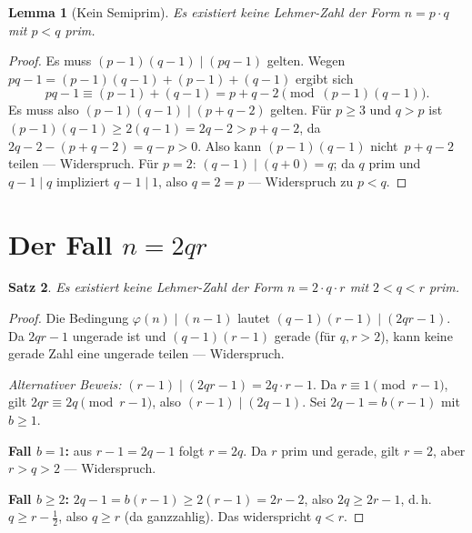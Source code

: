 \documentclass[12pt,a4paper]{amsart}
\newtheorem{theorem}{Satz}[section]
\newtheorem{lemma}[theorem]{Lemma}
\theoremstyle{definition}
\newcommand{\euler}{\varphi}
\begin{document}
\begin{lemma}[Kein Semiprim]
\label{lem:semiprim}
Es existiert keine Lehmer-Zahl der Form $n = p \cdot q$ mit $p < q$ prim.
\end{lemma}

\begin{proof}
Es muss $(p-1)(q-1) \mid (pq - 1)$ gelten.
Wegen $pq - 1 = (p-1)(q-1) + (p-1) + (q-1)$ ergibt sich
\[
  pq - 1 \equiv (p-1) + (q-1) = p + q - 2 \pmod{(p-1)(q-1)}.
\]
Es muss also $(p-1)(q-1) \mid (p + q - 2)$ gelten.
Für $p \ge 3$ und $q > p$ ist $(p-1)(q-1) \ge 2(q-1) = 2q - 2 > p + q - 2$,
da $2q - 2 - (p + q - 2) = q - p > 0$. Also kann $(p-1)(q-1)$ nicht~$p + q - 2$
teilen — Widerspruch. Für $p = 2$: $(q-1) \mid (q + 0) = q$; da $q$ prim und
$q - 1 \mid q$ impliziert $q - 1 \mid 1$, also $q = 2 = p$ — Widerspruch zu $p < q$.
\end{proof}

\section{Der Fall \texorpdfstring{$n = 2qr$}{n = 2qr}}
\label{sec:gerade}

\begin{theorem}
\label{thm:2qr}
Es existiert keine Lehmer-Zahl der Form $n = 2 \cdot q \cdot r$
mit $2 < q < r$ prim.
\end{theorem}

\begin{proof}
Die Bedingung $\euler(n) \mid (n-1)$ lautet $(q-1)(r-1) \mid (2qr - 1)$.
Da $2qr - 1$ ungerade ist und $(q-1)(r-1)$ gerade (für $q, r > 2$), kann keine
gerade Zahl eine ungerade teilen — Widerspruch.

\medskip\noindent\textit{Alternativer Beweis:}
$(r-1) \mid (2qr - 1) = 2q \cdot r - 1$.
Da $r \equiv 1 \pmod{r-1}$, gilt $2qr \equiv 2q \pmod{r-1}$, also
$(r-1) \mid (2q - 1)$. Sei $2q - 1 = b(r-1)$ mit $b \ge 1$.

\noindent\textbf{Fall $b = 1$:} aus $r - 1 = 2q - 1$ folgt $r = 2q$. Da $r$ prim und gerade,
gilt $r = 2$, aber $r > q > 2$ — Widerspruch.

\noindent\textbf{Fall $b \ge 2$:} $2q - 1 = b(r-1) \ge 2(r-1) = 2r - 2$,
also $2q \ge 2r - 1$, d.\,h. $q \ge r - \tfrac{1}{2}$, also $q \ge r$
(da ganzzahlig). Das widerspricht $q < r$.
\end{proof}

\end{document}

